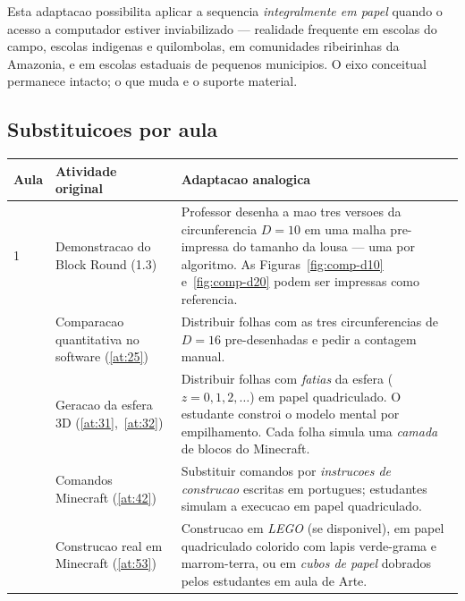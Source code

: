 \documentclass[12pt,a4paper]{scrartcl}
\begin{document}
Esta adaptacao possibilita aplicar a sequencia \emph{integralmente em papel} quando o acesso a computador estiver inviabilizado --- realidade frequente em escolas do campo, escolas indigenas e quilombolas, em comunidades ribeirinhas da Amazonia, e em escolas estaduais de pequenos municipios. O eixo conceitual permanece intacto; o que muda e o suporte material.

\subsection{Substituicoes por aula}

\begin{center}
\small
\begin{tabularx}{\textwidth}{@{}p{}p{}X@{}}
\toprule
\textbf{Aula} & \textbf{Atividade original} & \textbf{Adaptacao analogica} \\
\midrule
1 & Demonstracao do Block Round (1.3) & Professor desenha a mao tres versoes da circunferencia $D = 10$ em uma malha pre-impressa do tamanho da lousa --- uma por algoritmo. As Figuras~\ref{fig:comp-d10} e~\ref{fig:comp-d20} podem ser impressas como referencia. \\
\addlinespace[3pt]
2 & Comparacao quantitativa no software (\ref{at:25}) & Distribuir folhas com as tres circunferencias de $D = 16$ pre-desenhadas e pedir a contagem manual. \\
\addlinespace[3pt]
3 & Geracao da esfera 3D (\ref{at:31},~\ref{at:32}) & Distribuir folhas com \emph{fatias} da esfera ($z = 0, 1, 2, \ldots$) em papel quadriculado. O estudante constroi o modelo mental por empilhamento. Cada folha simula uma \emph{camada} de blocos do Minecraft. \\
\addlinespace[3pt]
4 & Comandos Minecraft (\ref{at:42}) & Substituir comandos por \emph{instrucoes de construcao} escritas em portugues; estudantes simulam a execucao em papel quadriculado. \\
\addlinespace[3pt]
5 & Construcao real em Minecraft (\ref{at:53}) & Construcao em \emph{LEGO} (se disponivel), em papel quadriculado colorido com lapis verde-grama e marrom-terra, ou em \emph{cubos de papel} dobrados pelos estudantes em aula de Arte. \\
\bottomrule
\end{tabularx}
\end{center}
\end{document}
